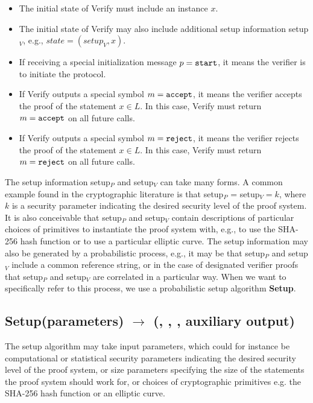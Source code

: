 \begin{itemize}
\item The initial state of Verify must include an instance $x$.
\item The initial state of Verify may also include additional setup information setup$_V$, e.g., $state = (setup_V,x)$.
\item If receiving a special initialization message $p = \tt start$, it means the verifier is to initiate the protocol.
\item If Verify outputs a special symbol $m = \tt accept$, it means the verifier accepts the proof of the statement $x \in L$. 
			In this case, Verify must return $m = \tt accept$ on all future calls.
\item If Verify outputs a special symbol $m = \tt reject$, it means the verifier rejects the proof of the statement $x \in L$. 
			In this case, Verify must return $m = \tt reject$ on all future calls.
\end{itemize}
 
	The setup information setup$_P$ and setup$_V$ can take many forms. 
	A common example found in the cryptographic literature is that setup$_P$ = setup$_V = k$, 
where $k$ is a security parameter indicating the desired security level of the proof system. 
	It is also conceivable that setup$_P$ and setup$_V$ contain descriptions of particular choices of primitives to instantiate the proof system with, e.g., to use the SHA-256 hash function or to use a particular elliptic curve. 
	The setup information may also be generated by a probabilistic process, e.g., 
it may be that setup$_P$ and setup$_V$ include a common reference string, 
or in the case of designated verifier proofs that setup$_P$ and setup$_V$ are correlated in a particular way. 
	When we want to specifically refer to this process, we use a probabilistic setup algorithm \textbf{Setup}.


\subsection[Setup]{\textbf{Setup}(parameters) 
$\rightarrow$ (\setR, \setP, \setV, auxiliary output)}

The setup algorithm may take input parameters, which could for instance be computational or statistical security parameters indicating the desired security level of the proof system, or size parameters specifying the size of the statements the proof system should work for, or choices of cryptographic primitives e.g. the SHA-256 hash function or an elliptic curve.

